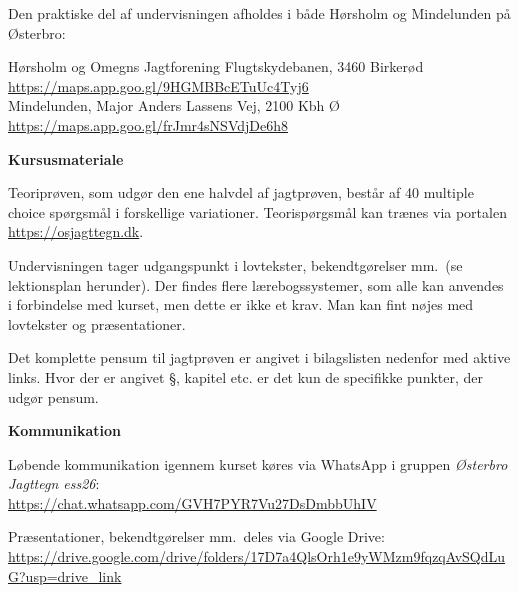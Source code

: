 \documentclass[10pt,a4paper]{article}
\begin{document}
\begin{flushleft}
\vspace{0.2cm}
Den praktiske del af undervisningen afholdes i både Hørsholm og Mindelunden på Østerbro:

\vspace{0.1cm}
\hspace{1em} Hørsholm og Omegns Jagtforening Flugtskydebanen, 3460 Birkerød\\
\hspace{1em} \url{https://maps.app.goo.gl/9HGMBBcETuUc4Tyj6}
\\
\vspace{0.2cm}
\hspace{1em} Mindelunden, Major Anders Lassens Vej, 2100 Kbh Ø\\
\hspace{1em} \url{https://maps.app.goo.gl/frJmr4sNSVdjDe6h8}

\vspace{0.4cm}
\textbf{Kursusmateriale}

\vspace{0.1cm}
Teoriprøven, som udgør den ene halvdel af jagtprøven, består af 40 multiple choice spørgsmål i forskellige variationer. Teorispørgsmål kan trænes via portalen \url{https://osjagttegn.dk}.

\vspace{0.2cm}
Undervisningen tager udgangspunkt i lovtekster, bekendtgørelser mm.\ (se lektionsplan herunder). Der findes flere lærebogssystemer, som alle kan anvendes i forbindelse med kurset, men dette er ikke et krav. Man kan fint nøjes med lovtekster og præsentationer.

\vspace{0.2cm}
Det komplette pensum til jagtprøven er angivet i bilagslisten nedenfor med aktive links. Hvor der er angivet §, kapitel etc. er det kun de specifikke punkter, der udgør pensum. 

\vspace{0.4cm}
\textbf{Kommunikation}

\vspace{0.1cm}
Løbende kommunikation igennem kurset køres via WhatsApp i gruppen \emph{Østerbro Jagttegn ess26}:\\
\url{https://chat.whatsapp.com/GVH7PYR7Vu27DsDmbbUhIV}

\vspace{0.2cm}
Præsentationer, bekendtgørelser mm.\ deles via Google Drive:\\
\url{https://drive.google.com/drive/folders/17D7a4QlsOrh1e9yWMzm9fqzqAvSQdLuG?usp=drive_link}


\end{flushleft}
\end{document}
